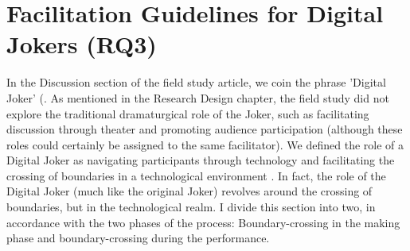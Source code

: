 \documentclass[dissertation,math,vertlayout,pdfa,colorlinks,nologo]{aaltoseries}
\begin{document}
\section{Facilitation Guidelines for Digital Jokers (RQ3)}
In the Discussion section of the field study article, we coin the phrase 'Digital Joker' (\cite[p. 19]{peledTeleroboticTheaterOppressed2025}. As mentioned in the Research Design chapter, the field study did not explore the traditional dramaturgical role of the Joker, such as facilitating discussion through theater and promoting audience participation (although these roles could certainly be assigned to the same facilitator). We defined the role of a Digital Joker as navigating participants through technology and facilitating the crossing of boundaries in a technological environment \cite[p. 19]{peledTeleroboticTheaterOppressed2025}. In fact, the role of the Digital Joker (much like the original Joker) revolves around the crossing of boundaries, but in the technological realm. I divide this section into two, in accordance with the two phases of the process: Boundary-crossing in the making phase and boundary-crossing during the performance.
\end{document}
